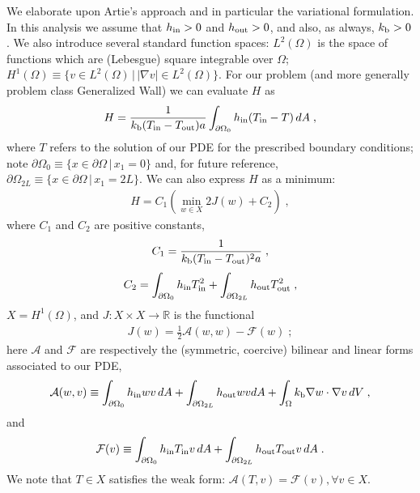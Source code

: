 \documentclass[preprint,12pt]{article}
\def\calA{\mathcal{A}}
\def\calF{\mathcal{F}}
\def\RR{\mathbb{R}}
\begin{document}
We elaborate upon Artie's approach and in particular the variational formulation. In this analysis we assume that $h_{\rm in} > 0$ and $h_{\rm out} > 0$, and also, as always, $k_{\rm b} > 0$. We also introduce several standard function spaces: $L^2(\Omega)$ is the space of functions which are (Lebesgue) square integrable over $\Omega$; $H^1(\Omega) \equiv \{ v \in L^2(\Omega)\,|\, |\nabla v| \in L^2({\Omega})\}$. For our problem (and more generally problem class Generalized Wall) we can evaluate $H$ as
\begin{align}
H = \frac{1}{k_{\rm b}(T_{\rm in} - T_{\rm out})a}\int_{\partial \Omega_0} h_{\rm in} (T_{\rm in} - T)\,dA \;,  \label{H1}
\end{align}
where $T$ refers to the solution of our PDE for the prescribed boundary conditions; note $\partial \Omega_0 \equiv \{ x \in \partial \Omega \, | \, x_1 = 0\}$ and, for future reference, $\partial \Omega_{2L} \equiv \{ x \in \partial \Omega \, | \, x_1 = 2L\}$. We can also express $H$ as a minimum:
\begin{align}
H = C_1(\min_{w \in X} 2 J(w) + C_2)\; , \label{H2}
\end{align}
where $C_1$ and $C_2$ are positive constants,
\begin{align}
C_1 = \frac{1}{k_{\rm b}(T_{\rm in} - T_{\rm out})^2 a}\; , \label{C1}
\end{align}
\begin{align}
C_2 =  \int_{\partial \Omega_0} h_{\rm in} T_{\rm in}^2 + \int_{\partial \Omega_{2L}} h_{\rm out} T_{\rm out}^2 \; , \label{C2}
\end{align}
$X = H^1(\Omega)$, and $J: X \times X \rightarrow \RR$ is the functional
\begin{align}
J(w) = \frac{1}{2} \calA(w,w) - \calF(w) \; ; \label{J}
\end{align}
here $\calA$ and $\calF$ are respectively the (symmetric, coercive) bilinear and linear forms associated to our PDE,
\begin{align}
\calA(w,v) \equiv \int_{\partial \Omega_0} h_{\rm in} w v\, dA + \int_{\partial \Omega_{2L}} h_{\rm out} w v dA + \int_\Omega k_{\rm b} \nabla w \cdot \nabla v\,dV  \; , \label{calA}
\end{align}
and
\begin{align}
\calF(v) \equiv \int_{\partial \Omega_0} h_{\rm in} T_{\rm in} v\, dA + \int_{\partial \Omega_{2L}} h_{\rm out} T_{\rm out} v\, dA\; . \label{calF}
\end{align}
We note that $T \in X$ satisfies the weak form: $\calA(T,v) = \calF(v), \forall v \in X$.
\end{document}
